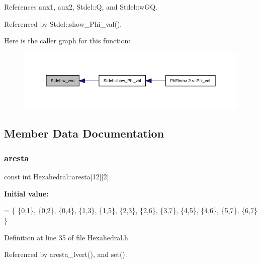 References aux1, aux2, Stdel\+::Q, and Stdel\+::w\+GQ.



Referenced by Stdel\+::show\+\_\+\+Phi\+\_\+val().

Here is the caller graph for this function\+:
\nopagebreak
\begin{figure}[H]
\begin{center}
\leavevmode
\includegraphics[width=350pt]{classStdel_a395c8d7d7890a9efdea23932fa22b420_icgraph}
\end{center}
\end{figure}


\subsection{Member Data Documentation}
\mbox{\label{classHexahedral_a195b8018b7e8b6d1366b1937803051e1}} 
\subsubsection{\texorpdfstring{aresta}{aresta}}
{\footnotesize\ttfamily const int Hexahedral\+::aresta\mbox{[}12\mbox{]}\mbox{[}2\mbox{]}\hspace{0.3cm}{\ttfamily [private]}}

{\bfseries Initial value\+:}
\begin{DoxyCode}
= 
   \{ \{0,1\},
     \{0,2\},
     \{0,4\},
     \{1,3\},
     \{1,5\},
     \{2,3\},
     \{2,6\},
     \{3,7\},
     \{4,5\},
     \{4,6\},
     \{5,7\},
     \{6,7\}
   \}
\end{DoxyCode}


Definition at line 35 of file Hexahedral.\+h.



Referenced by aresta\+\_\+lvert(), and set().

\mbox{\label{classStdel_a8b082d27e5c3cab7ad2045b464af0fd9}} 

